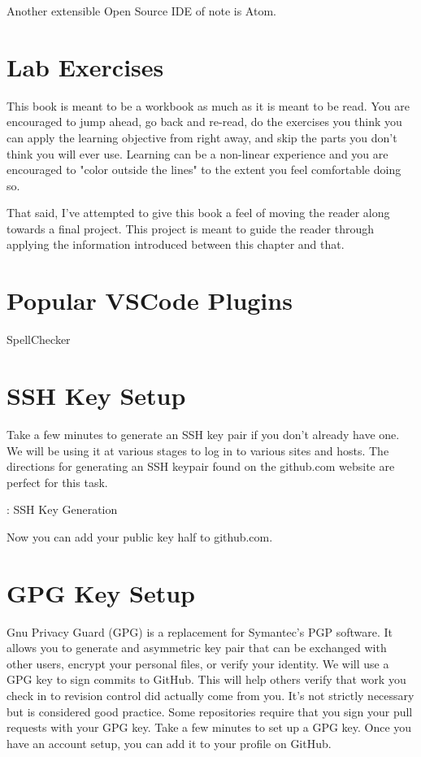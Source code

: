 \justify
Another extensible Open Source IDE of note is Atom.

\section{Lab Exercises}
\justify
This book is meant to be a workbook as much as it is meant to be read.
You are encouraged to jump ahead, go back and re-read, do the exercises
you think you can apply the learning objective from right away,
and skip the parts you don't think you will ever use. Learning can
be a non-linear experience and you
are encouraged to "color outside the lines" to the extent you feel
comfortable doing so.

\justify
That said, I've attempted to give this book a feel of moving the reader
along towards a final project.
This project is meant to guide the reader through applying the information
introduced between this chapter and that.

\section{Popular VSCode Plugins}
\justify
SpellChecker

\section{SSH Key Setup}
\justify
Take a few minutes to generate an SSH key pair if you don't already have
one. We will be using it at various stages to log in to various sites
and hosts. The directions for generating an SSH keypair found on the
github.com website
are perfect for this task.

\begin{mybox}{\thetcbcounter: SSH Key Generation}
	
\end{mybox}

\justify
Now you can add your public key half to github.com.

\section{GPG Key Setup}
\justify
Gnu Privacy Guard (GPG) is a replacement for Symantec's PGP software. It allows you
to generate and asymmetric key pair that can be exchanged with other users, encrypt your
personal files, or verify your identity.
\justify
We will use a GPG key to sign commits
to GitHub. This will help others verify that work you check in to revision control did
actually come from you. It's not strictly necessary but is considered good practice.
Some repositories require that you sign your pull requests with your GPG key.
\justify
Take a few minutes to set up a GPG key. Once you have an account setup, you can add
it to your profile on GitHub.

